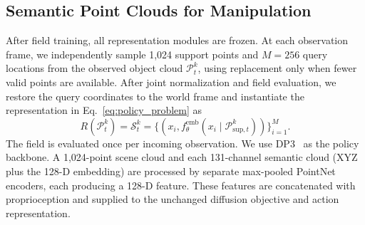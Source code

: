 \subsection{Semantic Point Clouds for Manipulation}
\label{sec:method_policy}

After field training, all representation modules are frozen. At each observation frame, we independently sample 1,024 support points and $M=256$ query locations from the observed object cloud $\mathcal{P}_t^k$, using replacement only when fewer valid points are available. After joint normalization and field evaluation, we restore the query coordinates to the world frame and instantiate the representation in Eq.~\eqref{eq:policy_problem} as
\begin{equation}
    R(\mathcal{P}_t^k)=\mathcal{S}_{t}^{k}
    =\{(x_i,f_{\theta}^{\mathrm{emb}}(x_i\mid\mathcal{P}_{\mathrm{sup},t}^{k}))\}_{i=1}^{M}.
    \label{eq:semantic_cloud}
\end{equation}
The field is evaluated once per incoming observation. We use DP3~\cite{ze20243d} as the policy backbone. A 1,024-point scene cloud and each 131-channel semantic cloud (XYZ plus the 128-D embedding) are processed by separate max-pooled PointNet encoders, each producing a 128-D feature. These features are concatenated with proprioception and supplied to the unchanged diffusion objective and action representation.
